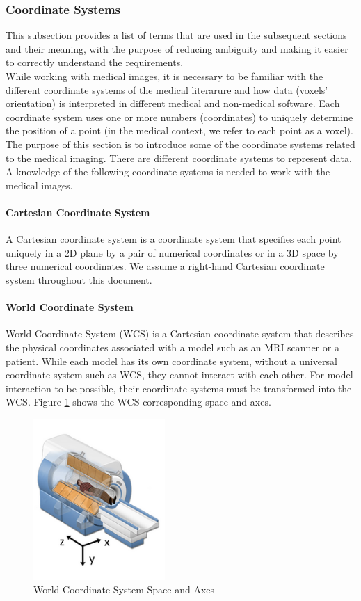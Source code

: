 \documentclass[12pt]{article}
\begin{document}
\subsubsection{Coordinate Systems}
This subsection provides a list of terms that are used in the subsequent
sections and their meaning, with the purpose of reducing ambiguity and making it
easier to correctly understand the requirements. \\

\noindent While working with medical images, it is necessary to be familiar with the different coordinate systems of the medical literarure and how data (voxels' orientation) is interpreted in different medical and non-medical software. Each coordinate system uses one or more numbers (coordinates) to uniquely determine the position of a point (in the medical context, we refer to each point as a voxel). The purpose of this section is to introduce some of the coordinate systems related to the medical imaging. There are different coordinate systems to represent data. A knowledge of the following coordinate systems is needed to work with the medical images.

\paragraph{Cartesian Coordinate System}
A Cartesian coordinate system is a coordinate system that specifies each point uniquely in a 2D plane by a pair of numerical coordinates or in a 3D space by three numerical coordinates. We assume a right-hand Cartesian coordinate system throughout this document.

\paragraph{World Coordinate System}
World Coordinate System (WCS) is a Cartesian coordinate system that describes the physical coordinates associated with a model such as an MRI scanner or a patient. While each model has its own coordinate system, without a universal coordinate system such as WCS, they cannot interact with each other. For model interaction to be possible, their coordinate systems must be transformed into the WCS. Figure \ref{WCS} shows the WCS corresponding space and axes.
\begin{figure}[hbpt!]
\centering
\includegraphics[width=50mm]{worldCoordinateSystem.png}
\caption{World Coordinate System Space and Axes~\cite{slicerWCS}}
\label{WCS}
\end{figure}
\end{document}
